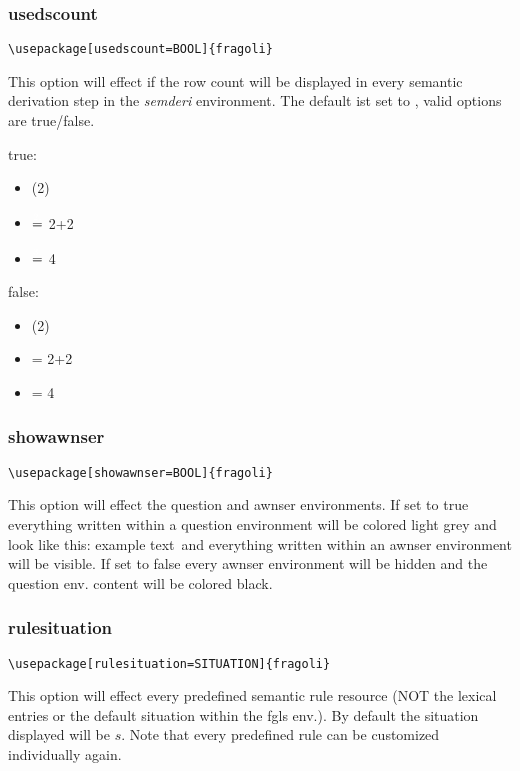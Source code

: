 \documentclass[10pt, a4paper]{article}
\newenvironment{itemizeexample}{
	\begin{itemize}
		\setlength\itemsep{-.5em}
	}
	{
	\end{itemize}
}
\begin{document}
	\subsubsection{usedscount}
	\begin{lstlisting}[style=A]
	\usepackage[usedscount=BOOL]{fragoli}
	\end{lstlisting}
	This option will effect if the row count will be displayed in every semantic derivation step in the \textit{semderi} environment. The default ist set to \texttt{}, valid options are true/false.
	\begin{center}
		\begin{minipage}[h][2cm][t]{15em}
			true:\begin{itemizeexample}
				\item[] (2)
				\item[$\stackrel{\color{deivationrowcountcolor}2.\color{black}}{=}$] 2+2
				\item[$\stackrel{\color{deivationrowcountcolor}3.\color{black}}{=}$] 4
			\end{itemizeexample}
		\end{minipage}
		\begin{minipage}[h][2cm][t]{15em}
			false:\begin{itemizeexample}
				\item[] (2)
				\item[=] 2+2
				\item[=] 4
			\end{itemizeexample}
		\end{minipage}
	\end{center}
	\subsubsection{showawnser}
	\begin{lstlisting}[style=A]
	\usepackage[showawnser=BOOL]{fragoli}
	\end{lstlisting}
	This option will effect the question and awnser environments. If set to true everything written within a question environment will be colored light grey and look like this: \color{dunkelgrau}example text\color{black}\ and everything written within an awnser environment will be visible. If set to false every awnser environment will be hidden and the question env. content will be colored black.
	\subsubsection{rulesituation}
	\begin{lstlisting}[style=A]
	\usepackage[rulesituation=SITUATION]{fragoli}
	\end{lstlisting}
	This option will effect every predefined semantic rule resource (NOT the lexical entries or the default situation within the fgls env.). By default the situation displayed will be $s$. Note that every predefined rule can be customized individually again.
\end{document}
